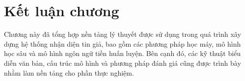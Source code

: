 \section{Kết luận chương}

Chương này đã tổng hợp nền tảng lý thuyết được sử dụng trong quá trình xây dựng hệ thống nhận diện tin giả, bao gồm các phương pháp học máy, mô hình học sâu và mô hình ngôn ngữ tiền huấn luyện. Bên cạnh đó, các kỹ thuật biểu diễn văn bản, cấu trúc mô hình và phương pháp đánh giá cũng được trình bày nhằm làm nền tảng cho phần thực nghiệm. 

\clearpage